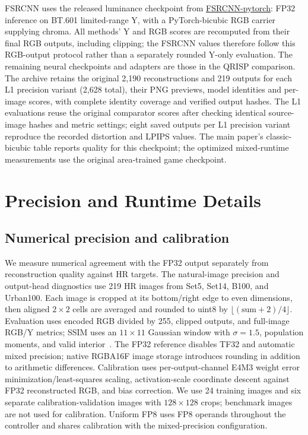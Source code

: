 \documentclass[10pt,twocolumn,letterpaper]{article}
\begin{document}
FSRCNN uses the released luminance checkpoint from \href{https://github.com/yjn870/FSRCNN-pytorch/blob/master/test.py}{FSRCNN-pytorch}: FP32 inference on BT.601 limited-range Y, with a PyTorch-bicubic RGB carrier supplying chroma.
All methods' Y and RGB scores are recomputed from their final RGB outputs, including clipping; the FSRCNN values therefore follow this RGB-output protocol rather than a separately rounded Y-only evaluation.
The remaining neural checkpoints and adapters are those in the QRISP comparison.
The archive retains the original 2,190 reconstructions and 219 outputs for each L1 precision variant (2,628 total), their PNG previews, model identities and per-image scores, with complete identity coverage and verified output hashes.
The L1 evaluations reuse the original comparator scores after checking identical source-image hashes and metric settings; eight saved outputs per L1 precision variant reproduce the recorded distortion and LPIPS values.
The main paper's classic-bicubic table reports quality for this checkpoint; the optimized mixed-runtime measurements use the original area-trained game checkpoint.

\section{Precision and Runtime Details}
\subsection{Numerical precision and calibration}
\label{sec:precision}
We measure numerical agreement with the FP32 output separately from reconstruction quality against HR targets.
The natural-image precision and output-head diagnostics use 219 HR images from Set5, Set14, B100, and Urban100.
Each image is cropped at its bottom/right edge to even dimensions, then aligned $2\times2$ cells are averaged and rounded to uint8 by $\lfloor(\mathrm{sum}+2)/4\rfloor$.
Evaluation uses encoded RGB divided by 255, clipped outputs, and full-image RGB/Y metrics; SSIM uses an $11\times11$ Gaussian window with $\sigma=1.5$, population moments, and valid interior~\cite{wang2004ssim}.
The FP32 reference disables TF32 and automatic mixed precision; native RGBA16F image storage introduces rounding in addition to arithmetic differences.
Calibration uses per-output-channel E4M3 weight error minimization/least-squares scaling, activation-scale coordinate descent against FP32 reconstructed RGB, and bias correction.
We use 24 training images and six separate calibration-validation images with $128\times128$ crops; benchmark images are not used for calibration.
Uniform FP8 uses FP8 operands throughout the controller and shares calibration with the mixed-precision configuration.
\end{document}
